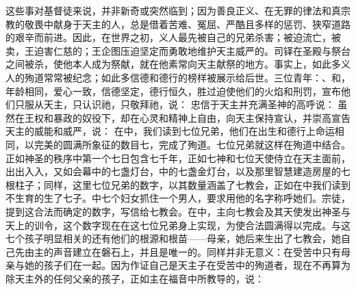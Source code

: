 这些事对基督徒来说，并非新奇或突然临到；因为善良正义、在无罪的律法和真宗教的敬畏中献身于天主的人，总是借着苦难、冤屈、严酷且多样的惩罚、狭窄道路的艰辛而前进。因此，在世界之初，义人最先被自己的兄弟杀害；被迫流亡，被卖，王迫害仁慈的；王企图压迫坚定而勇敢地维护天主威严的。司铎在圣殿与祭台之间被杀，使他本人成为祭献，就在他素常向天主献祭的地方。事实上，如此多义人的殉道常常被纪念；如此多信德和德行的榜样被展示给后世。三位青年：、和，年龄相同，爱心一致，信德坚定，德行恒久，胜过迫使他们的火焰和刑罚，宣布他们只服从天主，只认识祂，只敬拜祂，说： 忠信于天主并充满圣神的高呼说： 虽然在王权和暴政的奴役下，却在心灵和精神上自由，向天主保持宣认，并崇高宣告天主的威能和威严，说： 在中，我们读到七位兄弟，他们在出生和德行上命运相同，以完美的圆满所象征的数目七，完成了殉道。七位兄弟就这样在殉道中结合。正如神圣的秩序中第一个七日包含七千年，正如七神和七位天使侍立在天主面前，出出入入，又如会幕中的七盏灯台，中的七盏金灯台，以及那里智慧建造房屋的七根柱子；同样，这里七位兄弟的数字，以其数量涵盖了七教会，正如在中我们读到不生育的生了七子。中七个妇女抓住一个男人，要求用他的名字称呼她们。宗徒，提到这合法而确定的数字，写信给七教会。在中，主向七教会及其天使发出神圣与天上的训令，这个数字现在在这七位兄弟身上实现，为使合法圆满得以完成。与这七个孩子明显相关的还有他们的根源和根苗——母亲，她后来生出了七教会，她自己先由主的声音建立在磐石上，并且是唯一的。同样并非无意义：在受苦中只有母亲与她的孩子们在一起。因为作证自己是天主子在受苦中的殉道者，现在不再算为除天主外的任何父亲的孩子，正如主在福音中所教导的，说：\par

